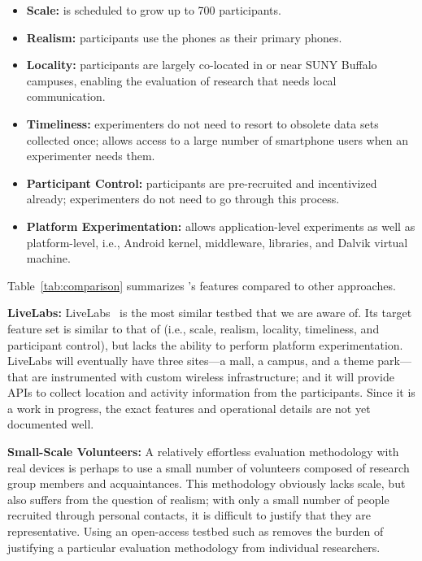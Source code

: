 \begin{itemize}[nosep]
\item {\bf Scale:} \PhoneLab{} is scheduled to grow up to 700 participants.
\item {\bf Realism:} \PhoneLab{} participants use the phones as their primary
phones.
\item {\bf Locality:} \PhoneLab{} participants are largely co-located in or near
SUNY Buffalo campuses, enabling the evaluation of research that needs local
communication.
\item {\bf Timeliness:} \PhoneLab{} experimenters do not need to resort to
obsolete data sets collected once; \PhoneLab{} allows access to a large number
of smartphone users when an experimenter needs them.
\item {\bf Participant Control:} \PhoneLab{} participants are pre-recruited and
incentivized already; experimenters do not need to go through this process.
\item {\bf Platform Experimentation:} \PhoneLab{} allows application-level
experiments as well as platform-level, i.e., Android kernel, middleware,
libraries, and Dalvik virtual machine.
\end{itemize}

Table~\ref{tab:comparison} summarizes \PhoneLab{}'s features compared to other
approaches.

{\bf LiveLabs:} LiveLabs~\cite{livelabs} is the most similar testbed that we are
aware of. Its target feature set is similar to that of \PhoneLab{} (i.e., scale,
realism, locality, timeliness, and participant control), but lacks the ability
to perform platform experimentation. LiveLabs will eventually have three
sites---a mall, a campus, and a theme park---that are instrumented with custom
wireless infrastructure; and it will provide APIs to collect location and
activity information from the participants. Since it is a work in progress, the
exact features and operational details are not yet documented well.

{\bf Small-Scale Volunteers:} A relatively effortless evaluation methodology
with real devices is perhaps to use a small number of volunteers composed of
research group members and acquaintances. This methodology obviously lacks
scale, but also suffers from the question of realism; with only a small number
of people recruited through personal contacts, it is difficult to justify that
they are representative. Using an open-access testbed such as \PhoneLab{}
removes the burden of justifying a particular evaluation methodology from
individual researchers.

